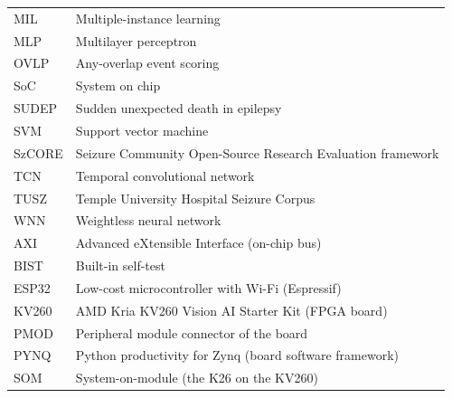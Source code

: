 \begin{longtable}{@{}p{30mm}p{120mm}@{}}
MIL & Multiple-instance learning\\
MLP & Multilayer perceptron\\
OVLP & Any-overlap event scoring\\
SoC & System on chip\\
SUDEP & Sudden unexpected death in epilepsy\\
SVM & Support vector machine\\
SzCORE & Seizure Community Open-Source Research Evaluation framework\\
TCN & Temporal convolutional network\\
TUSZ & Temple University Hospital Seizure Corpus\\
WNN & Weightless neural network\\
AXI & Advanced eXtensible Interface (on-chip bus)\\
BIST & Built-in self-test\\
ESP32 & Low-cost microcontroller with Wi-Fi (Espressif)\\
KV260 & AMD Kria KV260 Vision AI Starter Kit (FPGA board)\\
PMOD & Peripheral module connector of the board\\
PYNQ & Python productivity for Zynq (board software framework)\\
SOM & System-on-module (the K26 on the KV260)\\
\end{longtable}
